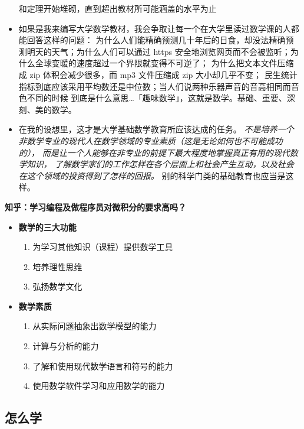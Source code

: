 \begin{shaded}
\begin{itemize}
	  和定理开始堆砌，直到超出教材所可能涵盖的水平为止
	  \item 如果是我来编写大学数学教材，我会争取让每一个在大学里读过数学课的人都能回答这样的问题：
	  为什么人们能精确预测几十年后的日食，却没法精确预测明天的天气；为什么人们可以通过 https 
	  安全地浏览网页而不会被监听；为什么全球变暖的速度超过一个界限就变得不可逆了；
	  为什么把文本文件压缩成 zip 体积会减少很多，而 mp3 文件压缩成 zip 大小却几乎不变；
	  民生统计指标到底应该采用平均数还是中位数；当人们说两种乐器声音的音高相同而音色不同的时候
	  到底是什么意思\ldots{}「趣味数学」，这就是数学。基础、重要、深刻、美的数学。
	  \item 在我的设想里，这才是大学基础数学教育所应该达成的任务。
	  {\it 不是培养一个非数学专业的现代人在数学领域的专业素质（这是无论如何也不可能成功的），
	  而是让一个人能够在非专业的前提下最大程度地掌握真正有用的现代数学知识，
	  了解数学家们的工作怎样在各个层面上和社会产生互动，以及社会在这个领域的投资得到了怎样的回报。}
	  别的科学门类的基础教育也应当是这样。
	\end{itemize}
	{\bf 知乎：学习编程及做程序员对微积分的要求高吗？}
\end{shaded}

\begin{itemize}
  \item {\bf 数学的三大功能}
  \begin{enumerate}
    \item 为学习其他知识（课程）提供数学工具
    \item 培养理性思维
    \item 弘扬数学文化
  \end{enumerate}
  \item {\bf 数学素质}
  \begin{enumerate}
    \item 从实际问题抽象出数学模型的能力
    \item 计算与分析的能力
    \item 了解和使用现代数学语言和符号的能力
    \item 使用数学软件学习和应用数学的能力
  \end{enumerate}
\end{itemize}

\subsection{怎么学}


